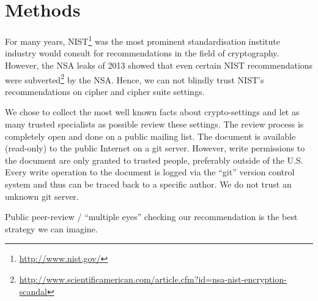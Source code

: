\section{Methods}

For many years, NIST\footnote{\url{http://www.nist.gov/}} was the most prominent
standardisation institute industry would consult for recommendations in the
field of cryptography. However, the NSA leaks of 2013 showed that even certain
NIST recommendations were
subverted\footnote{\url{http://www.scientificamerican.com/article.cfm?id=nsa-nist-encryption-scandal}}
by the NSA.  Hence, we can not blindly trust NIST's recommendations on cipher
and cipher suite settings. 

We chose to collect the most well known facts about crypto-settings and let as
many trusted specialists as possible review these settings.  The review process
is completely open and done on a public mailing list. The document is available
(read-only) to the public Internet on a git server. However, write permissions
to the document are only granted to trusted people, preferably outside of the
U.S.  Every write operation to the document is logged via the ``git'' version
control system and thus can be traced back to a specific author.  We do not
trust an unknown git server. 

Public peer-review / ``multiple eyes'' checking our recommendation is the best
strategy we can imagine.



